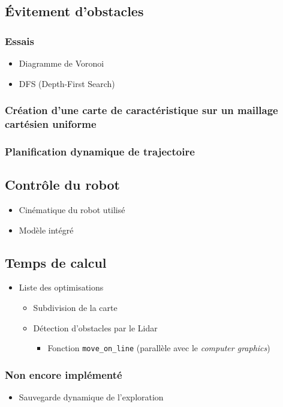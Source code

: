 \documentclass{article}
\numberwithin{figure}{section}
\numberwithin{table}{section}
\begin{document}
\subsection*{Évitement d'obstacles}
\subsubsection*{Essais}
\begin{itemize}
    \item Diagramme de Voronoi
    \item DFS (Depth-First Search)
\end{itemize}

\subsubsection*{Création d'une carte de caractéristique sur un maillage cartésien uniforme}
\subsubsection*{Planification dynamique de trajectoire}

\subsection*{Contrôle du robot}
\begin{itemize}
    \item Cinématique du robot utilisé
    \item Modèle intégré
\end{itemize}

\subsection*{Temps de calcul}
\begin{itemize}
    \item Liste des optimisations
    \begin{itemize}
        \item Subdivision de la carte
        \item Détection d'obstacles par le Lidar
        \begin{itemize}
            \item Fonction \texttt{move\_on\_line} (parallèle avec le \emph{computer graphics})
        \end{itemize}
    \end{itemize}
\end{itemize}

\subsubsection*{Non encore implémenté}
\begin{itemize}
    \item Sauvegarde dynamique de l'exploration
\end{itemize}




\newpage
{}

\footnotesize{}
\end{document}
